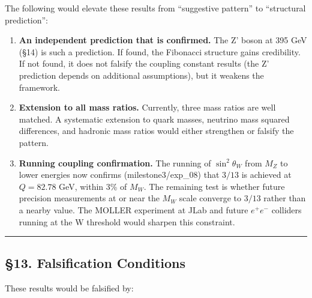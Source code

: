 \documentclass[
  11pt,
  a4paper]{article}
\begin{document}
The following would elevate these results from ``suggestive pattern'' to
``structural prediction'':

\begin{enumerate}
\def\labelenumi{\arabic{enumi}.}
\item
  \textbf{An independent prediction that is confirmed.} The Z' boson at
  395 GeV (§14) is such a prediction. If found, the Fibonacci structure
  gains credibility. If not found, it does not falsify the coupling
  constant results (the Z' prediction depends on additional
  assumptions), but it weakens the framework.
\item
  \textbf{Extension to all mass ratios.} Currently, three mass ratios
  are well matched. A systematic extension to quark masses, neutrino
  mass squared differences, and hadronic mass ratios would either
  strengthen or falsify the pattern.
\item
  \textbf{Running coupling confirmation.} The running of
  \(\sin^2\theta_W\) from \(M_Z\) to lower energies now confirms
  (milestone3/exp\_08) that \(3/13\) is achieved at \(Q = 82.78\) GeV,
  within 3\% of \(M_W\). The remaining test is whether future precision
  measurements at or near the \(M_W\) scale converge to \(3/13\) rather
  than a nearby value. The MOLLER experiment at JLab and future
  \(e^+e^-\) colliders running at the W threshold would sharpen this
  constraint.
\end{enumerate}

\begin{center}\rule{0.5\linewidth}{0.5pt}\end{center}

\subsection{§13. Falsification
Conditions}\label{falsification-conditions}

These results would be falsified by:
\end{document}
